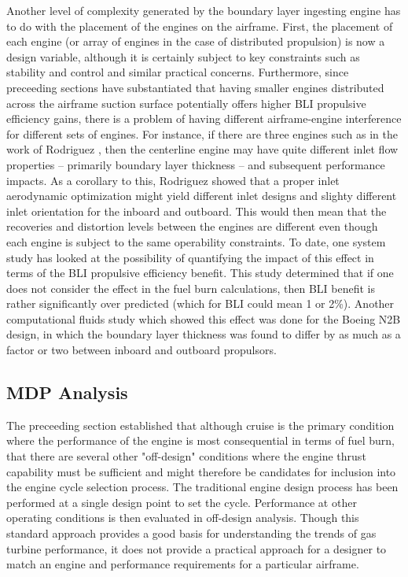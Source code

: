 \documentclass[12pt]{gatech-thesis}
\begin{document}
\indent Another level of complexity generated by the boundary layer ingesting engine has to do with the placement of the engines on the airframe.  First, the placement of each engine (or array of engines in the case of distributed propulsion) is now a design variable, although it is certainly subject to key constraints such as stability and control and similar practical concerns.  Furthermore, since preceeding sections have substantiated that having smaller engines distributed across the airframe suction surface potentially offers higher BLI propulsive efficiency gains, there is a problem of having different airframe-engine interference for different sets of engines.  For instance, if there are three engines such as in the work of Rodriguez \cite{RodriguezThesis}, then the centerline engine may have quite different inlet flow properties -- primarily boundary layer thickness -- and subsequent performance impacts.  As a corollary to this, Rodriguez showed that a proper inlet aerodynamic optimization might yield different inlet designs and slighty different inlet orientation for the inboard and outboard.  This would then mean that the recoveries and distortion levels between the engines are different even though each engine is subject to the same operability constraints.  To date, one system study has looked at the possibility of quantifying the impact of this \cite{Sato2011} effect in terms of the BLI propulsive efficiency benefit.  This study determined that if one does not consider the effect in the fuel burn calculations, then BLI benefit is rather significantly over predicted (which for BLI could mean 1 or 2\%).  Another computational fluids study \cite{Kim2012} which showed this effect was done for the Boeing N2B design, in which the boundary layer thickness was found to differ by as much as a factor or two between inboard and outboard propulsors. 
\subsection{MDP Analysis}

\indent The preceeding section established that although cruise is the primary condition where the performance of the engine is most consequential in terms of fuel burn, that there are several other "off-design" conditions where the engine thrust capability must be sufficient and might therefore be candidates for inclusion into the engine cycle selection process.  The traditional engine design process has been performed at a single design point to set the cycle.  Performance at other operating conditions is then evaluated in off-design analysis.  Though this standard approach provides a good basis for understanding the trends of gas turbine performance, it does not provide a practical approach for a designer to match an engine and performance requirements for a particular airframe.  
\end{document}
